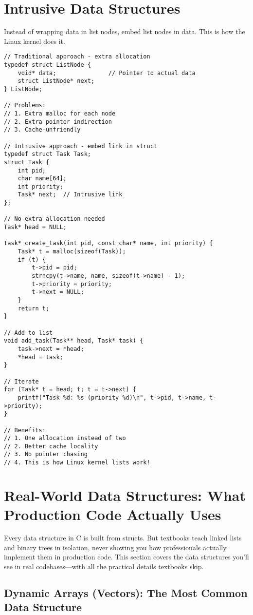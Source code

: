 \section{Intrusive Data Structures}

Instead of wrapping data in list nodes, embed list nodes in data. This is how the Linux kernel does it.

\begin{lstlisting}
// Traditional approach - extra allocation
typedef struct ListNode {
    void* data;               // Pointer to actual data
    struct ListNode* next;
} ListNode;

// Problems:
// 1. Extra malloc for each node
// 2. Extra pointer indirection
// 3. Cache-unfriendly

// Intrusive approach - embed link in struct
typedef struct Task Task;
struct Task {
    int pid;
    char name[64];
    int priority;
    Task* next;  // Intrusive link
};

// No extra allocation needed
Task* head = NULL;

Task* create_task(int pid, const char* name, int priority) {
    Task* t = malloc(sizeof(Task));
    if (t) {
        t->pid = pid;
        strncpy(t->name, name, sizeof(t->name) - 1);
        t->priority = priority;
        t->next = NULL;
    }
    return t;
}

// Add to list
void add_task(Task** head, Task* task) {
    task->next = *head;
    *head = task;
}

// Iterate
for (Task* t = head; t; t = t->next) {
    printf("Task %d: %s (priority %d)\n", t->pid, t->name, t->priority);
}

// Benefits:
// 1. One allocation instead of two
// 2. Better cache locality
// 3. No pointer chasing
// 4. This is how Linux kernel lists work!
\end{lstlisting}

\section{Real-World Data Structures: What Production Code Actually Uses}

Every data structure in C is built from structs. But textbooks teach linked lists and binary trees in isolation, never showing you how professionals actually implement them in production code. This section covers the data structures you'll see in real codebases---with all the practical details textbooks skip.

\subsection{Dynamic Arrays (Vectors): The Most Common Data Structure}

